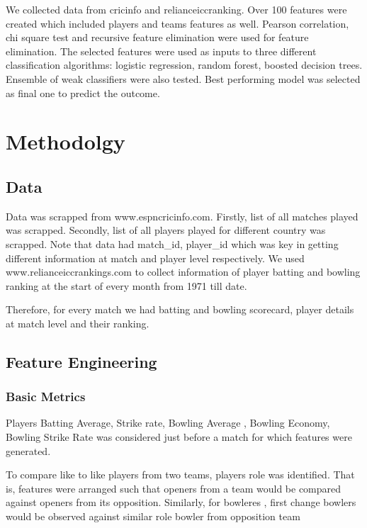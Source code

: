 \documentclass[a4paper]{article}
\begin{document}
We collected data from cricinfo and relianceiccranking. Over 100 features were created which included players and teams features as well.  Pearson correlation, chi square test and recursive feature elimination were used for feature elimination. The selected features were used as inputs to three different classification algorithms: logistic regression,
random forest, boosted decision trees. Ensemble of weak classifiers were also tested. Best performing model was selected as final one to predict the outcome.


\section{Methodolgy}

\subsection{Data}

Data was scrapped from www.espncricinfo.com. Firstly, list of all matches played was scrapped. Secondly, list of all players played for different country was scrapped. Note that data had match\_id, player\_id which was key in getting different information
at match and player level respectively. We used www.relianceiccrankings.com to collect information of player batting and bowling ranking at the start of every month from 1971 till date. 

Therefore, for every match we had batting and bowling scorecard, player details at match level and their ranking. 



\subsection{Feature Engineering}

\subsubsection{
Basic Metrics
}
Players Batting Average, Strike rate, Bowling Average , Bowling Economy, Bowling Strike Rate was considered just before a match for which features were generated. \newline

To compare like to like players from two teams, players role was identified.  That is, features were arranged such that openers from a team would be compared against openers from its opposition. Similarly, for bowleres , first change bowlers would be observed against similar role bowler from opposition team
\end{document}
